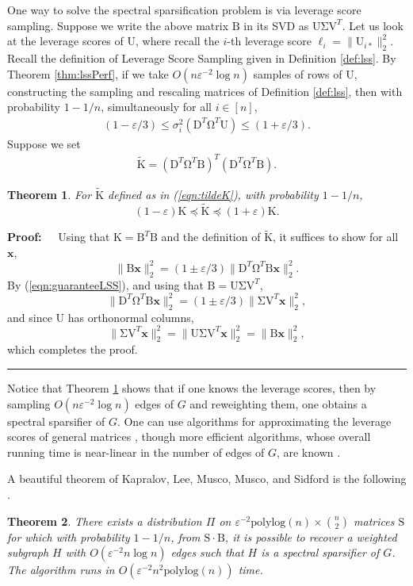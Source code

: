 \documentclass[11pt]{article}
\newtheorem{theorem}{Theorem}
\newenvironment{proof}{\begin{trivlist} \item {\bf Proof:~~}}
  {\qed\end{trivlist}}
\newcommand{\mat}[1]{{\ensuremath{\bm{\mathrm{#1}}}}}
\def\matB{\mat{B}}
\def\matD{\mat{D}}
\def\matK{\mat{K}}
\def\matS{\mat{S}}
\def\matU{\mat{U}}
\def\matV{\mat{V}}
\def\qed{\hfill\rule{2mm}{2mm}}
\def\x{{\mathbf x}}
\newcommand{\eps}{\varepsilon}
\newcommand{\polylog}{{\mathrm{polylog}}}
\begin{document}
One way to solve the spectral sparsification problem is via leverage score sampling. Suppose
we write the above matrix $\matB$ in its SVD as $\matU \mat\Sigma \matV^T$. Let us look at the leverage scores of $\matU$,
where recall the $i$-th leverage score $\ell_i = \|\matU_{i*}\|_2^2$. Recall the definition of Leverage
Score Sampling given in Definition \ref{def:lss}. By Theorem \ref{thm:lssPerf}, if we take
$O(n \eps^{-2} \log n)$ samples of rows of $\matU$, constructing the sampling and rescaling matrices
of Definition \ref{def:lss}, then with probability $1-1/n$, simultaneously for all $i \in [n]$,
\begin{eqnarray}\label{eqn:guaranteeLSS}
(1-\varepsilon/3) \leq \sigma_i^2(\matD^T \mat\Omega^T \matU) \leq (1+\varepsilon/3).
\end{eqnarray}
Suppose we set
\begin{eqnarray}\label{eqn:tildeK}
\tilde{\matK} = (\matD^T \mat\Omega^T \matB)^T (\matD^T \mat\Omega^T \matB).
\end{eqnarray}
\begin{theorem}\label{thm:lssSimple}
For $\tilde{\matK}$ defined as in (\ref{eqn:tildeK}), with probability $1-1/n$, 
$$(1-\varepsilon) \matK \preceq \tilde{\matK} \preceq (1+\varepsilon)\matK.$$
\end{theorem}
\begin{proof}
Using that $\matK = \matB^T\matB$ and the definition of $\tilde{\matK}$, it suffices to show for all $\x$, 
$$\|\matB\x\|_2^2 = (1 \pm \varepsilon/3) \|\matD^T \mat\Omega^T \matB \x\|_2^2.$$
By (\ref{eqn:guaranteeLSS}), and using that $\matB = \matU \mat\Sigma \matV^T$, 
$$\|\matD^T \mat\Omega^T \matB \x\|_2^2 = (1 \pm \varepsilon/3) \|\mat\Sigma \matV^T \x\|_2^2,$$
and since $\matU$ has orthonormal columns,
$$\|\mat\Sigma \matV^T \x\|_2^2 = \|\matU \mat\Sigma \matV^T \x\|_2^2 = \|\matB\x\|_2^2,$$
which completes the proof. 
\end{proof}
Notice that Theorem \ref{thm:lssSimple} shows that if one knows the leverage scores, then
by sampling $O(n \eps^{-2} \log n)$ edges of $G$ and reweighting them, one obtains a spectral
sparsifier of $G$. One can use algorithms for approximating the leverage scores of general matrices \cite{DMMW12},
though more efficient algorithms, whose overall running time is near-linear in the number of edges
of $G$, are known \cite{SS08,st11}. 

A beautiful theorem of Kapralov, Lee, Musco, Musco, and Sidford is the following \cite{KLMMS14}. 
\begin{theorem}\label{thm:linear}
There exists a distribution $\Pi$ on $\eps^{-2} \polylog(n) \times \binom{n}{2}$ matrices
$\matS$ for which with probability $1-1/n$, from $\matS \cdot \matB$, it is possible to recover a
weighted subgraph $H$ with $O(\eps^{-2} n \log n)$ edges such that $H$ is a spectral sparsifier of $G$. 
The algorithm runs in $O(\eps^{-2} n^2 \polylog(n))$ time.  
\end{theorem}
\end{document}
